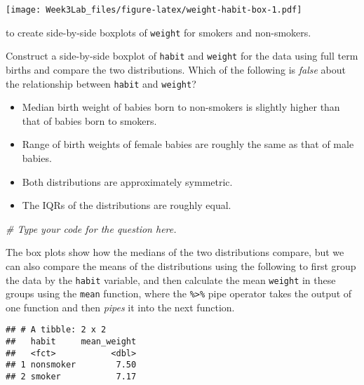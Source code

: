 \documentclass[]{article}
\newenvironment{Shaded}{\begin{snugshade}}{\end{snugshade}}
\newcommand{\KeywordTok}[1]{\textcolor[rgb]{0.13,0.29,0.53}{\textbf{#1}}}
\newcommand{\DataTypeTok}[1]{\textcolor[rgb]{0.13,0.29,0.53}{#1}}
\newcommand{\StringTok}[1]{\textcolor[rgb]{0.31,0.60,0.02}{#1}}
\newcommand{\CommentTok}[1]{\textcolor[rgb]{0.56,0.35,0.01}{\textit{#1}}}
\newcommand{\OperatorTok}[1]{\textcolor[rgb]{0.81,0.36,0.00}{\textbf{#1}}}
\newcommand{\NormalTok}[1]{#1}
\providecommand{\tightlist}{%
  \setlength{\itemsep}{0pt}\setlength{\parskip}{0pt}}
\begin{document}
\texttt{[image: Week3Lab\_files/figure-latex/weight-habit-box-1.pdf]}

to create side-by-side boxplots of \texttt{weight} for smokers and
non-smokers.

Construct a side-by-side boxplot of \texttt{habit} and \texttt{weight}
for the data using full term births and compare the two distributions.
Which of the following is \emph{false} about the relationship between
\texttt{habit} and \texttt{weight}?

\begin{itemize}
\tightlist
\item
  Median birth weight of babies born to non-smokers is slightly higher
  than that of babies born to smokers.
\item
  Range of birth weights of female babies are roughly the same as that
  of male babies.
\item
  Both distributions are approximately symmetric.
\item
  The IQRs of the distributions are roughly equal.
\end{itemize}

\begin{Shaded}
\begin{Highlighting}[]
\CommentTok{# Type your code for the question here.}
\end{Highlighting}
\end{Shaded}

The box plots show how the medians of the two distributions compare, but
we can also compare the means of the distributions using the following
to first group the data by the \texttt{habit} variable, and then
calculate the mean \texttt{weight} in these groups using the
\texttt{mean} function, where the \texttt{\%\textgreater{}\%} pipe
operator takes the output of one function and then \emph{pipes} it into
the next function.

\begin{Shaded}
\end{Shaded}

\begin{verbatim}
## # A tibble: 2 x 2
##   habit     mean_weight
##   <fct>           <dbl>
## 1 nonsmoker        7.50
## 2 smoker           7.17
\end{verbatim}
\end{document}
